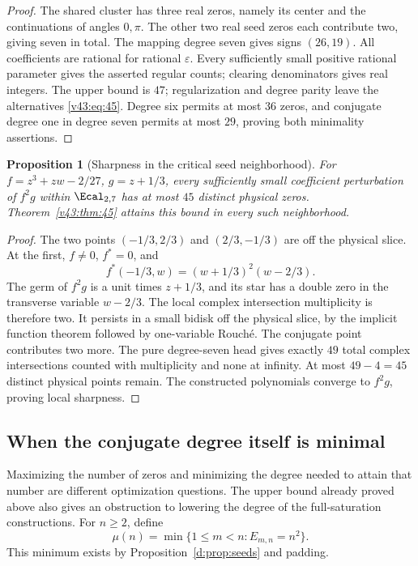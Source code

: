 \documentclass[UTF8,11pt]{ctexart}
\newtheorem{prop}[thm]{Proposition}
\theoremstyle{definition}
\numberwithin{equation}{section}
\begin{document}
\begin{proof}
The shared cluster has three real zeros, namely its center
and the continuations of angles $0,\pi$. The other two real
seed zeros each contribute two, giving seven in total.
The mapping degree seven gives signs $(26,19)$.
All coefficients are rational for rational $\varepsilon$.
Every sufficiently small positive rational parameter gives the
asserted regular counts; clearing denominators gives real integers.
The upper bound is $47$; regularization and degree parity leave
the alternatives \eqref{v43:eq:45}. Degree six permits at most
$36$ zeros, and conjugate degree one in degree seven permits
at most $29$, proving both minimality assertions.
\end{proof}

\begin{prop}[Sharpness in the critical seed neighborhood]
\label{v43:prop:localsharp}
For $f=z^3+zw-2/27$, $g=z+1/3$, every sufficiently small
coefficient perturbation of $f^2g$ within $\Ecal_{2,7}$ has
at most $45$ distinct physical zeros. Theorem~\ref{v43:thm:45}
attains this bound in every such neighborhood.
\end{prop}
\begin{proof}
The two points $(-1/3,2/3)$ and $(2/3,-1/3)$ are off the
physical slice. At the first, $f\ne0$, $f^*=0$, and
\[
             f^*(-1/3,w)=(w+1/3)^2(w-2/3).
\]
The germ of $f^2g$ is a unit times $z+1/3$, and its star
has a double zero in the transverse variable $w-2/3$.
The local complex intersection multiplicity is therefore two.
It persists in a small bidisk off the physical slice, by the
implicit function theorem followed by one-variable Rouch\'e.
The conjugate point contributes two more. The pure degree-seven
head gives exactly $49$ total complex intersections counted with
multiplicity and none at infinity. At most $49-4=45$ distinct
physical points remain. The constructed polynomials converge
to $f^2g$, proving local sharpness.
\end{proof}


\subsection{When the conjugate degree itself is minimal}
\label{v31:sec:minimumdegree}

Maximizing the number of zeros and minimizing the degree needed to
attain that number are different optimization questions. The upper
bound already proved above also gives an obstruction to lowering
the degree of the full-saturation constructions.
For $n\ge2$, define
\[
 \mu(n)=\min\{1\le m<n:E_{m,n}=n^2\}.
\]
This minimum exists by Proposition~\ref{d:prop:seeds} and padding.
\end{document}
